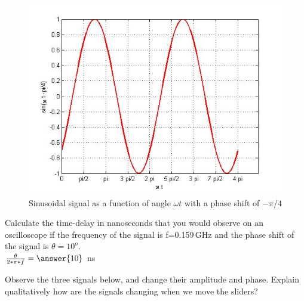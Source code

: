 \documentclass{ximera}
\begin{document}
\begin{figure} [htbp]
\includegraphics[scale=0.4]{jpg/cpef4.jpg}
\caption{Sinusoidal signal as a function of angle $\omega t$ with a phase shift of $-\pi/4$}
\label{sinMinus45Ph}
\end{figure}



\begin{question}  
Calculate the time-delay in nanoseconds that you would observe on an oscilloscope if the frequency of the signal is f=0.159\,GHz and the phase shift of the signal is $\theta=10^o$. \\
$ \frac{\theta}{2*\pi*f} = \answer{10}$  ns
\end{question} 

\begin{example}
Observe the three signals below, and change their amplitude and phase. Explain qualitatively how are the signals changing when we move the sliders?
\begin{center}  
\end{center} 
\end{example}
\end{document}
